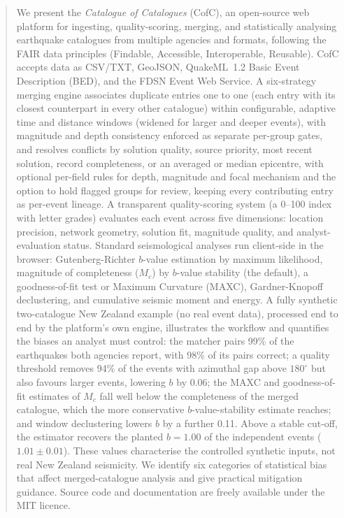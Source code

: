 \documentclass[12pt]{article}
\begin{document}
\begin{abstract}
We present the \emph{Catalogue of Catalogues} (CofC), an open-source web
platform for ingesting, quality-scoring, merging, and statistically
analysing earthquake catalogues from multiple agencies and formats, following
the FAIR data principles (Findable, Accessible, Interoperable, Reusable).  CofC accepts data as CSV/TXT, GeoJSON,
QuakeML~1.2 Basic Event Description (BED), and the FDSN Event Web Service.
A six-strategy merging engine associates duplicate entries one to one (each
entry with its closest counterpart in every other catalogue) within configurable,
adaptive time and distance windows (widened for larger and deeper events), with
magnitude and depth consistency enforced as separate per-group gates, and
resolves conflicts by solution quality, source priority, most recent solution,
record completeness, or an averaged or median epicentre, with optional per-field
rules for depth, magnitude and focal mechanism and the option to hold flagged
groups for review, keeping every contributing entry as per-event lineage.  A transparent quality-scoring system (a 0--100 index with
letter grades) evaluates each event across five dimensions: location precision,
network geometry, solution fit, magnitude quality, and analyst-evaluation status.
Standard seismological analyses run client-side in the browser:
Gutenberg-Richter $b$-value estimation by maximum likelihood, magnitude of
completeness ($M_c$) by $b$-value stability (the default), a goodness-of-fit test
or Maximum Curvature (MAXC),
Gardner-Knopoff declustering, and cumulative seismic moment and energy.  A fully
synthetic two-catalogue New Zealand example (no real event data), processed end to
end by the platform's own engine, illustrates the workflow and quantifies the
biases an analyst must control: the matcher pairs 99\% of the earthquakes both
agencies report, with 98\% of its pairs correct; a quality threshold removes 94\%
of the events with azimuthal gap above $180^{\circ}$ but also favours larger
events, lowering $b$ by 0.06; the MAXC and goodness-of-fit estimates of $M_c$
fall well below the completeness of the merged catalogue, which the more
conservative $b$-value-stability estimate reaches; and window declustering lowers
$b$ by a further 0.11.
Above a stable cut-off, the estimator recovers the planted $b = 1.00$ of the
independent events ($1.01 \pm 0.01$).  These values characterise the controlled
synthetic inputs, not real New Zealand seismicity.
We identify six categories of statistical bias that affect merged-catalogue
analysis and give practical mitigation guidance.  Source code and
documentation are freely available under the MIT licence.
\end{abstract}
\end{document}

